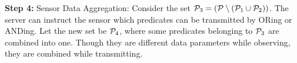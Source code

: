  \begin{comment}
\begin{boxedalgorithmic}[1] 
\Procedure{Co-factorAnalysis}{${\cal{P}}_1, {\cal{P}}_3, {\cal{C}}$}\\
{ Input:  (${\cal{P}}_1, {\cal{P}}_3, {\cal{C}}=\{{\cal{C}}_1,{\cal{C}}_2,\ldots,{\cal{C}}_k\}$)}\\
\Comment{\emph{Single Variable Co-factor Analysis}}
 \For {$c \in {\cal{C}}$}
  \For {$p \in {\cal{P}}_1 \cup {\cal{P}}_3$ and $\partial{c}/\partial{p} \neq 1$}
    \State calculate $c_p$ and $c_{\bar{p}}$
    \State Find the set ${\cal{P}}_{c_{p}}$, ${\cal{P}}_{c_{\bar{p}}}$, the set of all 
    \indent \indent ~variables required to evaluate $c_p$ and $c_{\bar{p}}$ 
  \EndFor
 \EndFor\\
\Comment{\emph{Multiple Variable Co-factor Analysis}}
  \For {$c \in {\cal{C}}$}
   \For {$p, q \in ({\cal{P}}_1 \cup {\cal{P}}_3)$ and $p\neq q$ and $\partial{c}/\partial{p} \neq 1$ 
   \indent \indent ~~and $\partial{c}/\partial{q} \neq 1$}
	\State calculate $c_{pq}$, $c_{\bar{p}q}$, $c_{p\bar{q}}$ and $c_{\bar{p}\bar{q}}$\\
  \indent \Comment{\emph{If the co-factor of $c$ with respect}} \\
  \indent \indent \Comment{\emph{   ~to any of the literals in the set}} \\
  \indent \indent \Comment{\emph{ $\{p,\bar{p},q,\bar{q}\}$}} is constant, then we\\
  \indent \indent \Comment{\emph{~ ~~~~do not calculate the double}}\\
  \indent \indent \Comment{\emph{variable co-factor involving that}}\\
  \indent \indent \Comment{\emph{ literal}}
	\State Find the set ${\cal{P}}_{c_{pq}}$, ${\cal{P}}_{c_{\bar{p}q}}$, ${\cal{P}}_{c_{p\bar{q}}}$ and 
	${\cal{P}}_{c_{\bar{p}\bar{q}}}$,
      \indent \indent~ the set of all variables required to evaluate 
      \indent \indent~ $c_{pq}$, $c_{\bar{p}q}$, $c_{p\bar{q}}$ and $c_{\bar{p}\bar{q}}$  
      \EndFor  
   \EndFor
 \EndProcedure
\end{boxedalgorithmic}   
\label{algo2}
\end{comment}
\vspace{2 mm}
\noindent
 {\bf{Step 4:}} Sensor Data Aggregation: Consider the set 
 ${\cal{P}}_3 = ({\cal{P}} \setminus ({\cal{P}}_1 \cup {\cal{P}}_2))$. The server can 
 instruct the sensor which predicates can be transmitted by ORing or ANDing. 
 Let the new set be ${\cal{P}}_4$, where some predicates belonging to ${\cal{P}}_3$ are 
 combined into one. Though they are different data parameters while observing, 
 they are combined while transmitting.
 
